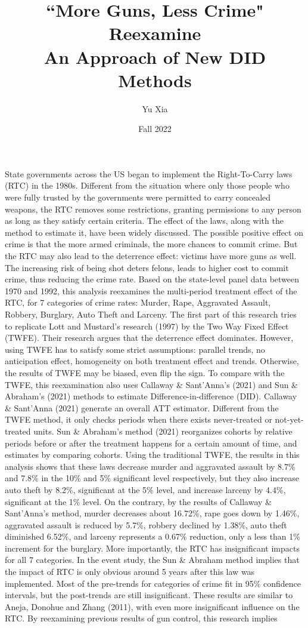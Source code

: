 \documentclass{article}
\author{Yu Xia}
\title{``More Guns, Less Crime" Reexamine \\ \large An Approach of New DID Methods}
\date{Fall 2022}
\begin{document}
\maketitle

\nocite{*}

    State governments across the US began to implement the Right-To-Carry laws (RTC) in the 1980s. Different from the situation where only those people who were fully trusted by the governments were permitted to carry concealed weapons, the RTC removes some restrictions, granting permissions to any person as long as they satisfy certain criteria. The effect of the laws, along with the method to estimate it, have been widely discussed. The possible positive effect on crime is that the more armed criminals, the more chances to commit crime. But the RTC may also lead to the deterrence effect: victims have more guns as well. The increasing risk of being shot deters felons, leads to higher cost to commit crime, thus reducing the crime rate. Based on the state-level panel data between 1970 and 1992, this analysis reexamines the multi-period treatment effect of the RTC, for 7 categories of crime rates: Murder, Rape, Aggravated Assault, Robbery, Burglary, Auto Theft and Larceny. The first part of this research tries to replicate Lott and Mustard's research (1997) by the Two Way Fixed Effect (TWFE). Their research argues that the deterrence effect dominates. However, using TWFE has to satisfy some strict assumptions: parallel trends, no anticipation effect, homogeneity on both treatment effect and trends. Otherwise, the results of TWFE may be biased, even flip the sign. To compare with the TWFE, this reexamination also uses Callaway \& Sant'Anna's (2021) and Sun \& Abraham's (2021) methods to estimate Difference-in-difference (DID). Callaway \& Sant'Anna (2021) generate an overall ATT estimator. Different from the TWFE method, it only checks periods when there exists never-treated or not-yet-treated units. Sun \& Abraham's method (2021) reorganizes cohorts by relative periods before or after the treatment happens for a certain amount of time, and estimates by comparing cohorts. Using the traditional TWFE, the results in this analysis shows that these laws decrease murder and aggravated assault by 8.7\% and 7.8\% in the 10\% and 5\% significant level respectively, but they also increase auto theft by 8.2\%, significant at the 5\% level, and increase larceny by 4.4\%, significant at the 1\% level. On the contrary, by the results of Callaway \& Sant'Anna's method, murder decreases about 16.72\%, rape goes down by 1.46\%, aggravated assault is reduced by 5.7\%, robbery declined by 1.38\%, auto theft diminished 6.52\%, and larceny represents a 0.67\% reduction, only a less than 1\% increment for the burglary. More importantly, the RTC has insignificant impacts for all 7 categories. In the event study, the Sun \& Abraham method implies that the impact of RTC is only obvious around 5 years after this law was implemented. Most of the pre-trends for categories of crime fit in 95\% confidence intervals, but the post-trends are still insignificant. These results are similar to Aneja, Donohue and Zhang (2011), with even more insignificant influence on the RTC. By reexamining previous results of gun control, this research implies 
\end{document}
